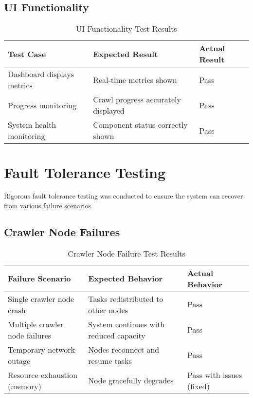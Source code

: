 \documentclass[12pt,a4paper]{report}
\begin{document}
\subsection{UI Functionality}
\begin{table}[H]
    \centering
    \begin{tabularx}{\textwidth}{|X|X|X|}
        \hline
        \textbf{Test Case} & \textbf{Expected Result} & \textbf{Actual Result} \\
        \hline
        Dashboard displays metrics & Real-time metrics shown & Pass \\
        \hline
        Progress monitoring & Crawl progress accurately displayed & Pass \\
        \hline
        System health monitoring & Component status correctly shown & Pass \\
        \hline
    \end{tabularx}
    \caption{UI Functionality Test Results}
\end{table}

\section{Fault Tolerance Testing}
Rigorous fault tolerance testing was conducted to ensure the system can recover from various failure scenarios.

\subsection{Crawler Node Failures}
\begin{table}[H]
    \centering
    \begin{tabularx}{\textwidth}{|X|X|X|}
        \hline
        \textbf{Failure Scenario} & \textbf{Expected Behavior} & \textbf{Actual Behavior} \\
        \hline
        Single crawler node crash & Tasks redistributed to other nodes & Pass \\
        \hline
        Multiple crawler node failures & System continues with reduced capacity & Pass \\
        \hline
        Temporary network outage & Nodes reconnect and resume tasks & Pass \\
        \hline
        Resource exhaustion (memory) & Node gracefully degrades & Pass with issues (fixed) \\
        \hline
    \end{tabularx}
    \caption{Crawler Node Failure Test Results}
\end{table}
\end{document}
